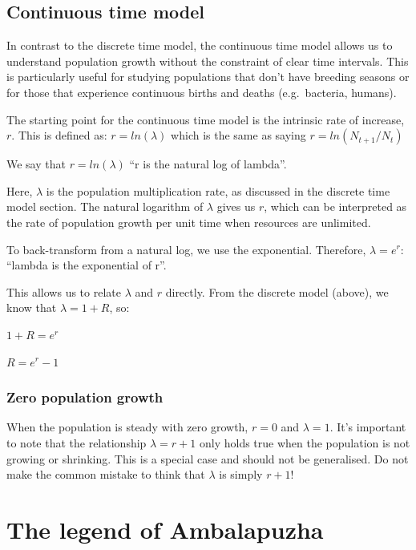 \documentclass[
  a4paper]{book}
\begin{document}
\section{Continuous time model}\label{continuous-time-model}

In contrast to the discrete time model, the continuous time model allows us to understand population growth without the constraint of clear time intervals. This is particularly useful for studying populations that don't have breeding seasons or for those that experience continuous births and deaths (e.g.~bacteria, humans).

The starting point for the continuous time model is the intrinsic rate of increase, \(r\). This is defined as: \(r = ln(\lambda)\) which is the same as saying \(r = ln(N_{t+1}/N_t)\)

We say that \(r = ln(\lambda)\) ``r is the natural log of lambda''.

Here, \(\lambda\) is the population multiplication rate, as discussed in the discrete time model section. The natural logarithm of \(\lambda\) gives us \(r\), which can be interpreted as the rate of population growth per unit time when resources are unlimited.

To back-transform from a natural log, we use the exponential. Therefore, \(\lambda = e^r\): ``lambda is the exponential of r''.

This allows us to relate \(\lambda\) and \(r\) directly. From the discrete model (above), we know that \(\lambda = 1 + R\), so:

\(1+R = e^r\)

\(R = e^r - 1\)

\subsection{Zero population growth}\label{zero-population-growth}

When the population is steady with zero growth, \(r = 0\) and \(\lambda  = 1\). It's important to note that the relationship \(\lambda = r + 1\) only holds true when the population is not growing or shrinking. This is a special case and should not be generalised. Do not make the common mistake to think that \(\lambda\) is simply \(r + 1\)!

\chapter{The legend of Ambalapuzha}\label{the-legend-of-ambalapuzha}
\end{document}
